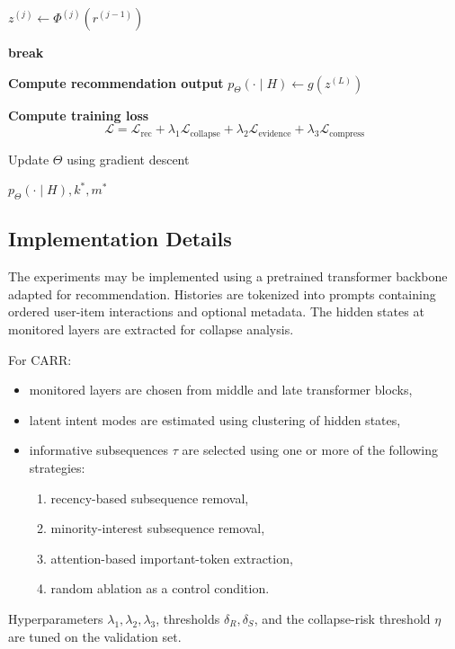 \documentclass[11pt]{article}
\begin{document}
\begin{algorithm}[t]
\begin{algorithmic}[1]
                \State $z^{(j)} \gets \Phi^{(j)}(r^{(j-1)})$
            \EndFor

            \State \textbf{break}
        \EndIf

    \EndIf
\EndFor

\State \textbf{Compute recommendation output}
\State $p_{\Theta}(\cdot \mid H) \gets g(z^{(L)})$

\State \textbf{Compute training loss}
\[
\mathcal{L} =
\mathcal{L}_{\mathrm{rec}} +
\lambda_1 \mathcal{L}_{\mathrm{collapse}} +
\lambda_2 \mathcal{L}_{\mathrm{evidence}} +
\lambda_3 \mathcal{L}_{\mathrm{compress}}
\]

\State Update $\Theta$ using gradient descent

\State \Return $p_{\Theta}(\cdot \mid H), k^*, m^*$

\end{algorithmic}
\end{algorithm}
\subsection{Implementation Details}

The experiments may be implemented using a pretrained transformer backbone adapted for recommendation. Histories are tokenized into prompts containing ordered user-item interactions and optional metadata. The hidden states at monitored layers are extracted for collapse analysis.

For CARR:
\begin{itemize}
    \item monitored layers are chosen from middle and late transformer blocks,
    \item latent intent modes are estimated using clustering of hidden states,
    \item informative subsequences $\tau$ are selected using one or more of the following strategies:
    \begin{enumerate}
        \item recency-based subsequence removal,
        \item minority-interest subsequence removal,
        \item attention-based important-token extraction,
        \item random ablation as a control condition.
    \end{enumerate}
\end{itemize}

Hyperparameters $\lambda_1,\lambda_2,\lambda_3$, thresholds $\delta_R,\delta_S$, and the collapse-risk threshold $\eta$ are tuned on the validation set.
\end{document}
